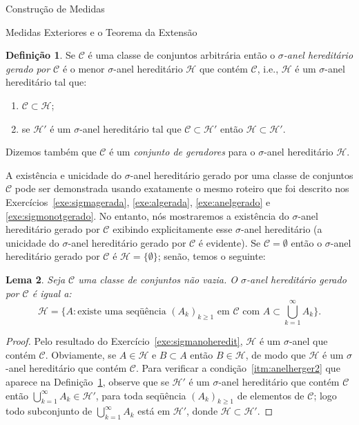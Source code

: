 \documentclass[oneside,final,11pt]{amsbook}
\theoremstyle{remark}\newtheorem{exercise}{Exercício}[chapter]
\theoremstyle{remark}\newtheorem{*exercise}[exercise]{\hbox to 0pt{\hskip 0pt minus 1fil*}Exercício}
\theoremstyle{definition}\newtheorem{exdefin}{Definição}[chapter]
\theoremstyle{plain}\newtheorem{teo}{Teorema}[section]
\theoremstyle{plain}\newtheorem{lem}[teo]{Lema}
\theoremstyle{plain}\newtheorem{prop}[teo]{Proposição}
\theoremstyle{plain}\newtheorem{cor}[teo]{Corolário}
\theoremstyle{definition}\newtheorem{defin}[teo]{Definição}
\theoremstyle{remark}\newtheorem{rem}[teo]{Observação}
\theoremstyle{definition}\newtheorem{notation}[teo]{Notação}
\theoremstyle{definition}\newtheorem{convention}[teo]{Convenção}
\theoremstyle{definition}\newtheorem{example}[teo]{Exemplo}
\numberwithin{section}{chapter}
\numberwithin{equation}{section}
\begin{document}
\begin{chapter}{Construção de Medidas}
\begin{section}{Medidas Exteriores e o Teorema da Extensão}
\begin{defin}\label{thm:sigmaherger}
Se $\mathcal C$ é uma classe de conjuntos arbitrária então o {\em $\sigma$-anel hereditário
gerado por $\mathcal C$\/} é o menor $\sigma$-anel hereditário $\mathcal H$ que contém $\mathcal C$, i.e., $\mathcal H$ é um $\sigma$-anel
hereditário tal que:
\begin{enumerate}
\item $\mathcal C\subset\mathcal H$;
\item\label{itm:anelherger2} se $\mathcal H'$ é um $\sigma$-anel hereditário tal que
$\mathcal C\subset\mathcal H'$ então $\mathcal H\subset\mathcal H'$.
\end{enumerate}
Dizemos também que $\mathcal C$ é um {\em conjunto de geradores\/}%
para o $\sigma$-anel hereditário $\mathcal H$.
\end{defin}
A existência e unicidade do $\sigma$-anel hereditário gerado por uma classe de conjuntos
$\mathcal C$ pode ser demonstrada usando exatamente o mesmo roteiro que foi descrito
nos Exercícios~\ref{exe:sigmagerada}, \ref{exe:algerada}, \ref{exe:anelgerado} e \ref{exe:sigmonotgerado}.
No entanto, nós mostraremos a existência do $\sigma$-anel hereditário gerado por $\mathcal C$
exibindo explicitamente esse $\sigma$-anel hereditário (a unicidade do $\sigma$-anel hereditário
gerado por $\mathcal C$ é evidente). Se $\mathcal C=\emptyset$ então o $\sigma$-anel
hereditário gerado por $\mathcal C$ é $\mathcal H=\{\emptyset\}$; senão, temos o seguinte:
\begin{lem}
Seja $\mathcal C$ uma classe de conjuntos não vazia. O $\sigma$-anel hereditário gerado
por $\mathcal C$ é igual a:
\begin{equation}\label{eq:anelherger}
\mathcal H=\Big\{A:\text{existe uma seqüência $(A_k)_{k\ge1}$ em $\mathcal C$ com $A\subset\bigcup_{k=1}^\infty A_k$}\Big\}.
\end{equation}
\end{lem}
\begin{proof}
Pelo resultado do Exercício~\ref{exe:sigmanoheredit}, $\mathcal H$ é um $\sigma$-anel que
contém $\mathcal C$. Obviamente, se $A\in\mathcal H$ e $B\subset A$ então $B\in\mathcal H$,
de modo que $\mathcal H$ é um $\sigma$-anel hereditário que contém $\mathcal C$.
Para verificar a condição~\eqref{itm:anelherger2} que aparece na Definição~\ref{thm:sigmaherger},
observe que se $\mathcal H'$ é um $\sigma$-anel hereditário que contém $\mathcal C$ então
$\bigcup_{k=1}^\infty A_k\in\mathcal H'$, para toda seqüência $(A_k)_{k\ge1}$ de elementos
de $\mathcal C$; logo todo subconjunto de $\bigcup_{k=1}^\infty A_k$ está
em $\mathcal H'$, donde $\mathcal H\subset\mathcal H'$.
\end{proof}


\end{section}
\end{chapter}
\end{document}
